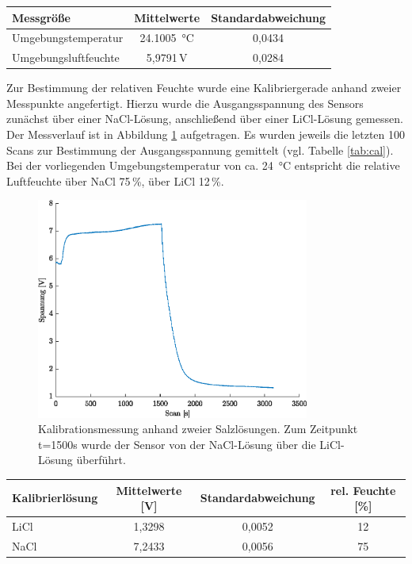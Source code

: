 \begin{center}
	\begin{tabular}{l|c|c}
		\label{tab:amb}
		
		\textbf{Messgröße} & \textbf{Mittelwerte} & \textbf{Standardabweichung}\\
		\hline
		Umgebungstemperatur & \SI{24,1005}{\celsius} & 0,0434\\
		Umgebungsluftfeuchte & 5,9791\,V & 0,0284
	\end{tabular}
\end{center}

Zur Bestimmung der relativen Feuchte wurde eine Kalibriergerade anhand zweier Messpunkte angefertigt. Hierzu wurde die Ausgangsspannung des Sensors zunächst über einer NaCl-Lösung, anschließend über einer LiCl-Lösung gemessen. Der Messverlauf ist in Abbildung \ref{fig:cal} aufgetragen. Es wurden jeweils die letzten 100 Scans zur Bestimmung der Ausgangsspannung gemittelt (vgl. Tabelle \ref{tab:cal}). Bei der vorliegenden Umgebungstemperatur von ca. \SI{24}{\celsius} entspricht die relative Luftfeuchte über NaCl 75\,\%, über LiCl 12\,\%. 

\begin{figure}[H]
	\centering
	\includegraphics[width=0.8\textwidth]{../DATA/Messreihe_Feuchtekalibration.eps}
	\caption[Kalibrationsmessung]{Kalibrationsmessung anhand zweier Salzlösungen. Zum Zeitpunkt t=1500s wurde der Sensor von der NaCl-Lösung über die LiCl-Lösung überführt.}
	\label{fig:cal}
\end{figure}

\begin{center}
	\begin{tabular}{l|c|c|c}
		\label{tab:cal}
		
		\textbf{Kalibrierlösung} & \textbf{Mittelwerte} [V]& \textbf{Standardabweichung} & rel. Feuchte [\%]\\
		\hline
		LiCl & 1,3298 & 0,0052 & 12\\
		NaCl & 7,2433 & 0,0056 & 75
	\end{tabular}
\end{center}

